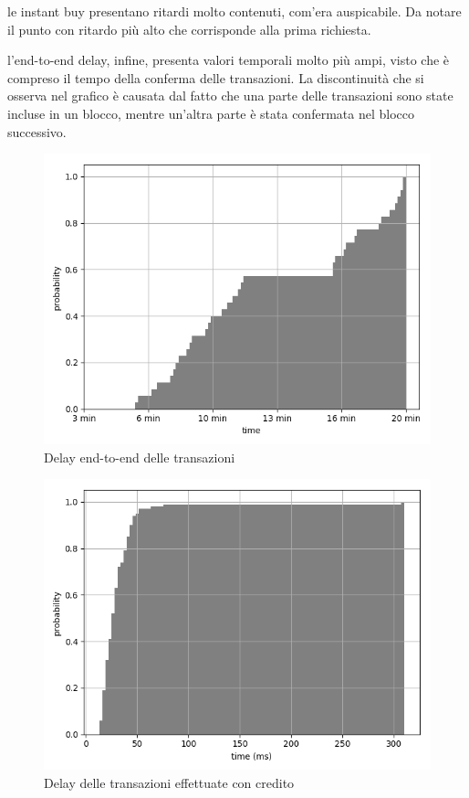 le instant buy presentano ritardi molto contenuti, com'era auspicabile. Da notare il punto con ritardo più alto che corrisponde alla prima richiesta.

l'end-to-end delay, infine, presenta valori temporali molto più ampi, visto che è compreso il tempo della conferma delle transazioni. La discontinuità che si osserva nel grafico è causata dal fatto che una parte delle transazioni sono state incluse in un blocco, mentre un'altra parte è stata confermata nel blocco successivo.

\begin{figure}[h!t]
\centerline{\includegraphics[width=\textwidth]{img/end-to-endGIUSTO}}
\caption{Delay end-to-end delle transazioni}
\label{f:calcoli:end2end}
\end{figure}

\begin{figure}[h!t]
\centerline{\includegraphics[width=\textwidth]{img/instant-buy-delay-grey}}
\caption{Delay delle transazioni effettuate con credito}
\label{f:calcoli:instant}
\end{figure}

